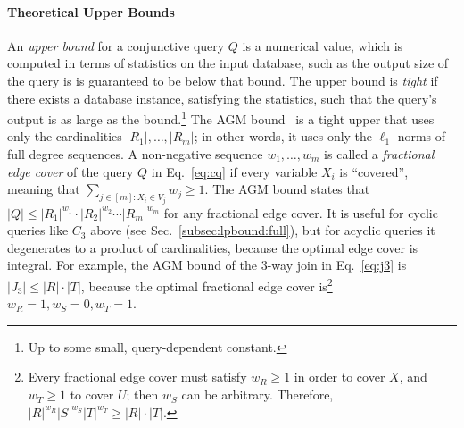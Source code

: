 \paragraph{Theoretical Upper Bounds}
An \emph{upper bound} for a
conjunctive query $Q$ is a numerical value, which is computed in terms
of statistics on the input database,  such as the output size of the query is
is guaranteed to be below that bound.  The upper bound is \emph{tight}
if there exists a database instance, satisfying the statistics, such
that the query's output is as large as the bound.\footnote{Up to some
  small, query-dependent constant.}  The AGM
bound~\cite{DBLP:journals/siamcomp/AtseriasGM13} is a tight upper that
uses only the cardinalities $|R_1|, \ldots, |R_m|$; in other words, it
uses only the $\ell_1$-norms of full degree sequences.  A non-negative
sequence $w_1, \ldots, w_m$ is called a \emph{fractional edge cover}
of the query $Q$ in Eq.~\eqref{eq:cq} if every variable $X_i$ is
``covered'', meaning that $\sum_{j\in[m]: X_i \in V_j}w_j \geq 1$.  The AGM
bound states that
$|Q| \leq |R_1|^{w_1}\cdot|R_2|^{w_2}\cdots|R_m|^{w_m}$ for any
fractional edge cover.  It is useful for cyclic
queries like $C_3$ above (see Sec.~\ref{subsec:lpbound:full}), but for
acyclic queries it degenerates to a product of cardinalities, because
the optimal edge cover is integral.  For example, the AGM bound of the
3-way join in Eq.~\eqref{eq:j3} is $|J_3| \leq |R|\cdot |T|$, because
the optimal fractional edge cover is\footnote{Every fractional edge
  cover must satisfy $w_R\geq 1$ in order to cover $X$, and
  $w_T \geq 1$ to cover $U$; then $w_S$ can be arbitrary.  Therefore,
  $|R|^{w_R}|S|^{w_S}|T|^{w_T}\geq |R|\cdot|T|$.}
$w_R=1, w_S=0, w_T=1$.

